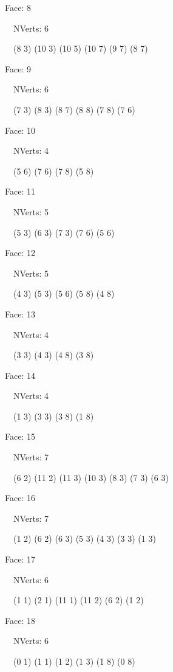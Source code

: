 \documentclass{article}
\begin{document}
{\footnotesize 

Face: 8

\   \    NVerts: 6

 \   \   (8 3) (10 3) (10 5) (10 7) (9 7) (8 7)}

{\footnotesize 

Face: 9

\   \    NVerts: 6

 \   \   (7 3) (8 3) (8 7) (8 8) (7 8) (7 6)}

{\footnotesize 

Face: 10

\   \    NVerts: 4

 \   \   (5 6) (7 6) (7 8) (5 8)}

{\footnotesize 

Face: 11

\   \    NVerts: 5

 \   \   (5 3) (6 3) (7 3) (7 6) (5 6)}

{\footnotesize 

Face: 12

\   \    NVerts: 5

 \   \   (4 3) (5 3) (5 6) (5 8) (4 8)}

{\footnotesize 

Face: 13

\   \    NVerts: 4

 \   \   (3 3) (4 3) (4 8) (3 8)}

{\footnotesize 

Face: 14

\   \    NVerts: 4

 \   \   (1 3) (3 3) (3 8) (1 8)}

{\footnotesize 

Face: 15

\   \    NVerts: 7

 \   \   (6 2) (11 2) (11 3) (10 3) (8 3) (7 3) (6 3)}

{\footnotesize 

Face: 16

\   \    NVerts: 7

 \   \   (1 2) (6 2) (6 3) (5 3) (4 3) (3 3) (1 3)}

{\footnotesize 

Face: 17

\   \    NVerts: 6

 \   \   (1 1) (2 1) (11 1) (11 2) (6 2) (1 2)}

{\footnotesize 

Face: 18

\   \    NVerts: 6

 \   \   (0 1) (1 1) (1 2) (1 3) (1 8) (0 8)}
\end{document}
